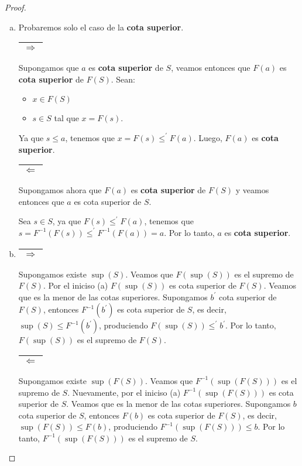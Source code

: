   \begin{proof}
    \begin{enumerate}[a)]
      \item Probaremos solo el caso de la \textbf{cota superior}.
        \PN \begin{tabular}{|c|} \hline $\Rightarrow$ \\\hline \end{tabular} Supongamos que $a$ es \textbf{cota
        superior} de $S$, veamos entonces que $F(a)$ es \textbf{cota superior} de $F(S)$. Sean:
        \begin{itemize}
          \item $x \in F(S)$
          \item $s \in S$ tal que $x = F(s)$.
        \end{itemize}

        \PN Ya que $s \leq a$, tenemos que $x = F(s) \leq^{\prime} F(a)$. Luego, $F(a)$ es \textbf{cota superior}.

        \PN \begin{tabular}{|c|} \hline $\Leftarrow$ \\\hline \end{tabular} Supongamos ahora que $F(a)$ es \textbf{cota
        superior} de $F(S)$ y veamos entonces que $a$ es cota superior de $S$.

        \PN Sea $s \in S$, ya que $F(s) \leq^{\prime} F(a)$, tenemos que $s = F^{-1}(F(s)) \leq^{\prime} F^{-1}(F(a)) =
        a$. Por lo tanto, $a$ es \textbf{cota superior}.

      \item \begin{tabular}{|c|} \hline $\Rightarrow$ \\\hline \end{tabular} Supongamos existe $\sup (S)$. Veamos
        que $F(\sup (S))$ es el supremo de $F(S)$. Por el iniciso (a) $F(\sup (S))$ es cota superior de $F(S)$. Veamos
        que es la menor de las cotas superiores. Supongamos $b^{\prime}$ cota superior de $F(S)$, entonces
        $F^{-1}(b^{\prime})$ es cota superior de $S$, es decir, $\sup (S) \leq F^{-1}(b^{\prime})$, produciendo
        $F(\sup (S)) \leq^{\prime} b^{\prime}$. Por lo tanto, $F(\sup (S))$ es el supremo de $F(S)$.

        \PN \begin{tabular}{|c|} \hline $\Leftarrow$ \\\hline \end{tabular} Supongamos existe $\sup (F(S))$. Veamos
        que $F^{-1}(\sup (F(S)))$ es el supremo de $S$. Nuevamente, por el iniciso (a) $F^{-1}(\sup (F(S)))$ es cota
        superior de $S$. Veamos que es la menor de las cotas superiores. Supongamos $b$ cota superior de $S$, entonces
        $F(b)$ es cota superior de $F(S)$, es decir, $\sup (F(S)) \leq F(b)$, produciendo $F^{-1}(\sup (F(S))) \leq b$.
        Por lo tanto, $F^{-1}(\sup (F(S)))$ es el supremo de $S$.


\end{enumerate}
\end{proof}
